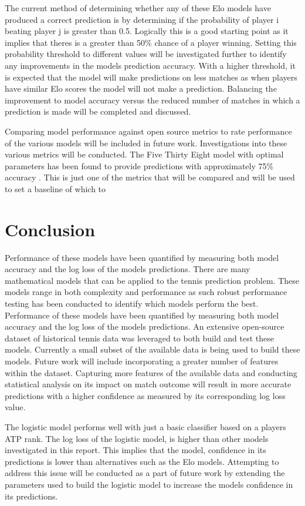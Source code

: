 \documentclass[12pt,a4paper]{article}
\begin{document}
The current method of determining whether any of these Elo models have produced a correct
prediction is by determining if the probability of player i beating player j is greater
than 0.5. Logically this is a good starting point as it implies that theres is a greater
than 50\% chance of a player winning. Setting this probability threshold to different values
will be investigated further to identify any improvements in the models prediction accuracy.
With a higher threshold, it is expected that the model will make predictions on less
matches as when players have similar Elo scores the model will not make a prediction.
Balancing the improvement to model accuracy versus the reduced number of matches in which
a prediction is made will be completed and discussed.

Comparing model performance against open source metrics to rate performance of the various
models will be included in future work. Investigations into these various metrics will be
conducted. The Five Thirty Eight model with optimal parameters has been found to provide
predictions with approximately 75\% accuracy \cite{kovalchik_searching_2016}. This is just
one of the metrics that will be compared and will be used to set a baseline of which to


\clearpage

\section{Conclusion}
Performance of these models have been quantified by measuring both
model accuracy and the log loss of the models predictions. There are many mathematical models that can be applied to the tennis prediction problem.
These models range in both complexity and performance as such robust performance testing
has been conducted to identify which models perform the best. Performance of these models
have been quantified by measuring both model accuracy and the log loss of the models
predictions. An extensive open-source dataset of historical tennis data was leveraged to
both build and test these models. Currently a small subset of the available data is being
used to build these models. Future work will include incorporating a greater number of
features within the dataset. Capturing more features of the available data and conducting
statistical analysis on its impact on match outcome will result in more accurate predictions
with a higher confidence as measured by its corresponding log loss value.

The logistic model performs well with just a basic classifier based on a
players ATP rank. The log loss of the logistic model, is higher than other models
investigated in this report. This implies that the model,
confidence in its predictions is lower than alternatives such as the Elo models.
Attempting to address this issue will be conducted as a part of future work by
extending the parameters used to build the logistic model to increase the models
confidence in its predictions.
\end{document}
